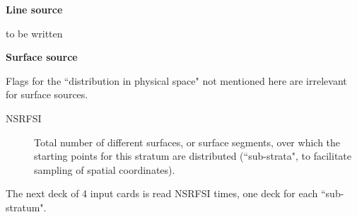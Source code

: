 \medskip

\textcolor[rgb]{0.00,0.00,1.00}{\textbf{Line source}}

to be written

\medskip

\textcolor[rgb]{0.00,0.00,1.00}{\textbf{Surface source}}

Flags for the ``distribution in physical space" not mentioned here are
irrelevant for surface sources.

\begin{description}
  \item[NSRFSI] Total number of different surfaces, or surface segments, over
        which the starting points for this stratum are distributed (``sub-strata", to
        facilitate sampling of spatial coordinates).
\end{description}
The next deck of 4 input cards is read NSRFSI times, one deck for each
``sub-stratum".
